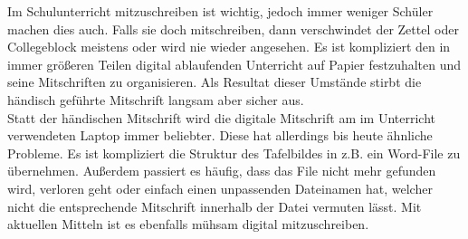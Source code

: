 
Im Schulunterricht mitzuschreiben ist wichtig, jedoch immer weniger Schüler machen dies auch. Falls sie doch mitschreiben, dann verschwindet der Zettel oder Collegeblock meistens oder wird nie wieder angesehen. Es ist kompliziert den in immer größeren Teilen digital ablaufenden Unterricht auf Papier festzuhalten und seine Mitschriften zu organisieren. Als Resultat dieser Umstände stirbt die händisch geführte Mitschrift langsam aber sicher aus. \\

Statt der händischen Mitschrift wird die digitale Mitschrift am im Unterricht verwendeten Laptop immer beliebter. Diese hat allerdings bis heute ähnliche Probleme. Es ist kompliziert die Struktur des Tafelbildes in z.B. ein Word-File zu übernehmen. Außerdem passiert es häufig, dass das File nicht mehr gefunden wird, verloren geht oder einfach einen unpassenden Dateinamen hat, welcher nicht die entsprechende Mitschrift innerhalb der Datei vermuten lässt. Mit aktuellen Mitteln ist es ebenfalls mühsam digital mitzuschreiben.